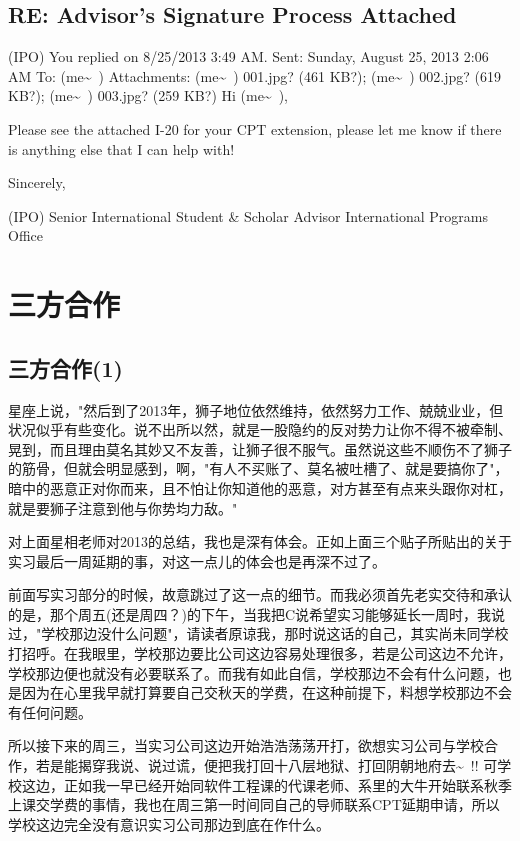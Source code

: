 \documentclass[12pt]{book}
\begin{document}
\section{RE: Advisor's Signature Process Attached}
\label{sec-37-5}
(IPO)
You replied on 8/25/2013 3:49 AM.
Sent:        Sunday, August 25, 2013 2:06 AM
To:        
(me\textasciitilde{}~)
Attachments:        
(me\textasciitilde{}~) 001.jpg? (461 KB?); (me\textasciitilde{}~) 002.jpg? (619 KB?); (me\textasciitilde{}~) 003.jpg? (259 KB?)
Hi (me\textasciitilde{}~),

Please see the attached I-20 for your CPT extension, please let me know if there is anything else that I can help with!

Sincerely,

(IPO)
Senior International Student \& Scholar Advisor
International Programs Office

\chapter{三方合作}
\label{sec-38}
\section{三方合作(1)}
\label{sec-38-1}

星座上说，"然后到了2013年，狮子地位依然维持，依然努力工作、兢兢业业，但状况似乎有些变化。说不出所以然，就是一股隐约的反对势力让你不得不被牵制、晃到，而且理由莫名其妙又不友善，让狮子很不服气。虽然说这些不顺伤不了狮子的筋骨，但就会明显感到，啊，"有人不买账了、莫名被吐槽了、就是要搞你了"，暗中的恶意正对你而来，且不怕让你知道他的恶意，对方甚至有点来头跟你对杠，就是要狮子注意到他与你势均力敌。"

对上面星相老师对2013的总结，我也是深有体会。正如上面三个贴子所贴出的关于实习最后一周延期的事，对这一点儿的体会也是再深不过了。

前面写实习部分的时候，故意跳过了这一点的细节。而我必须首先老实交待和承认的是，那个周五(还是周四？)的下午，当我把C说希望实习能够延长一周时，我说过，"学校那边没什么问题"，请读者原谅我，那时说这话的自己，其实尚未同学校打招呼。在我眼里，学校那边要比公司这边容易处理很多，若是公司这边不允许，学校那边便也就没有必要联系了。而我有如此自信，学校那边不会有什么问题，也是因为在心里我早就打算要自己交秋天的学费，在这种前提下，料想学校那边不会有任何问题。

所以接下来的周三，当实习公司这边开始浩浩荡荡开打，欲想实习公司与学校合作，若是能揭穿我说、说过谎，便把我打回十八层地狱、打回阴朝地府去\textasciitilde{}~!! 可学校这边，正如我一早已经开始同软件工程课的代课老师、系里的大牛开始联系秋季上课交学费的事情，我也在周三第一时间同自己的导师联系CPT延期申请，所以学校这边完全没有意识实习公司那边到底在作什么。
\end{document}
